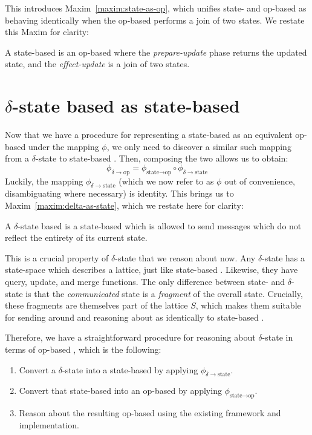 This introduces Maxim~\ref{maxim:state-as-op}, which unifies state- and op-based
\CRDTs as behaving identically when the op-based \CRDT performs a join of two
states. We restate this Maxim for clarity:

\setcounter{maxim}{0}
\begin{maxim}
  A state-based \CRDT is an op-based \CRDT where the \emph{prepare-update} phase
  returns the updated state, and the \emph{effect-update} is a join of two
  states.
\end{maxim}

\section{$\delta$-state based \CRDTs as state-based}
\label{sec:delta-as-state}
Now that we have a procedure for representing a state-based \CRDT as an
equivalent op-based \CRDT under the mapping $\phi$, we only need to discover a
similar such mapping from a $\delta$-state to state-based \CRDT.  Then,
composing the two allows us to obtain:
\[
  \phi_{\delta \to \text{op}} =
    \phi_{\text{state} \to \text{op}} \circ
    \phi_{\delta \to \text{state}}
\]
Luckily, the mapping $\phi_{\delta \to \text{state}}$ (which we now refer to
as $\phi$ out of convenience, disambiguating where necessary) is identity.
This brings us to Maxim~\ref{maxim:delta-as-state}, which we restate here for
clarity:

\setcounter{maxim}{1}
\begin{maxim}
  A $\delta$-state based \CRDT is a state-based \CRDT which is allowed to send
  messages which do not reflect the entirety of its current state.
\end{maxim}

This is a crucial property of $\delta$-state \CRDTs that we reason about now. Any
$\delta$-state \CRDT has a state-space which describes a lattice, just like
state-based \CRDTs. Likewise, they have query, update, and merge functions. The
only difference between state- and $\delta$-state \CRDTs is that the
\emph{communicated} state is a \emph{fragment} of the overall state. Crucially,
these fragments are themselves part of the lattice $S$, which makes them
suitable for sending around and reasoning about as identically to state-based
\CRDTs.

Therefore, we have a straightforward procedure for reasoning about
$\delta$-state \CRDTs in terms of op-based \CRDTs, which is the following:
\begin{enumerate}
  \item Convert a $\delta$-state \CRDT into a state-based \CRDT by applying
    $\phi_{\delta \to \text{state}}$.
  \item Convert that state-based \CRDT into an op-based \CRDT by applying
    $\phi_{\text{state} \to \text{op}}$.
  \item Reason about the resulting op-based \CRDT using the existing framework
    and implementation.
\end{enumerate}

\TODO[conclude]
